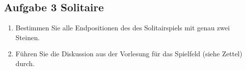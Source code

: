 \documentclass[11pt,a4paper,ngerman]{article}
\begin{document}
\subsection*{Aufgabe 3 \mdseries Solitaire}

\begin{enumerate}[\bfseries (a)]

\item Bestimmen Sie alle Endpositionen des des Solitairspiels mit genau zwei Steinen.


\item Führen Sie die Diskussion aus der Vorlesung für das Spielfeld (siehe Zettel) durch.

\end{enumerate}

\label{LastPage}
\end{document}
